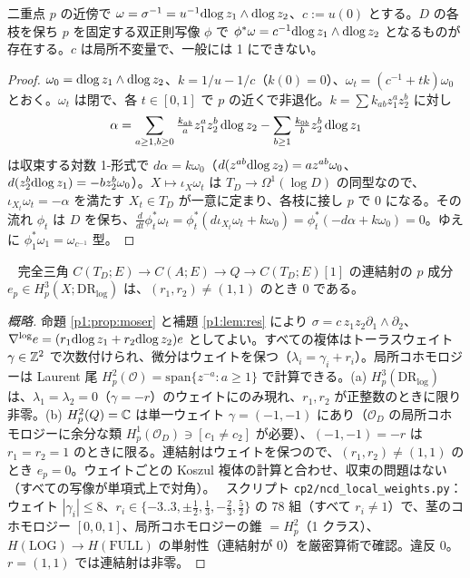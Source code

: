 \begin{prop}\tP\label{p1:prop:moser}
二重点 $p$ の近傍で $\omega=\sigma^{-1}=u^{-1}\mathrm{dlog}\, z_1\wedge\mathrm{dlog}\, z_2$、$c:=u(0)$ とする。$D$ の各枝を保ち $p$ を固定する双正則写像 $\phi$ で $\phi^*\omega=c^{-1}\mathrm{dlog}\, z_1\wedge\mathrm{dlog}\, z_2$ となるものが存在する。$c$ は局所不変量で、一般には 1 にできない。
\end{prop}
\begin{proof}
$\omega_0=\mathrm{dlog}\, z_1\wedge\mathrm{dlog}\, z_2$、$k=1/u-1/c$（$k(0)=0$）、$\omega_t=(c^{-1}+tk)\omega_0$ とおく。$\omega_t$ は閉で、各 $t\in[0,1]$ で $p$ の近くで非退化。$k=\sum k_{ab}z_1^az_2^b$ に対し
\[\alpha=\sum_{a\ge1,b\ge0}\tfrac{k_{ab}}{a}z_1^az_2^b\,\mathrm{dlog}\, z_2-\sum_{b\ge1}\tfrac{k_{0b}}{b}z_2^b\,\mathrm{dlog}\, z_1\]
は収束する対数 1-形式で $d\alpha=k\omega_0$（$d(z^{ab}\mathrm{dlog}\, z_2)=az^{ab}\omega_0$、$d(z_2^b\mathrm{dlog}\, z_1)=-bz_2^b\omega_0$）。$X\mapsto\iota_X\omega_t$ は $T_D\to\Omega^1(\log D)$ の同型なので、$\iota_{X_t}\omega_t=-\alpha$ を満たす $X_t\in T_D$ が一意に定まり、各枝に接し $p$ で 0 になる。その流れ $\phi_t$ は $D$ を保ち、$\tfrac{d}{dt}\phi_t^*\omega_t=\phi_t^*(d\iota_{X_t}\omega_t+k\omega_0)=\phi_t^*(-d\alpha+k\omega_0)=0$。ゆえに $\phi_1^*\omega_1=\omega_{c^{-1}}$ 型。\qedhere
\end{proof}
\begin{lem}[連結射の消滅]\tP\ \tV\label{p1:lem:conn}
完全三角 $C(T_D;E)\to C(A;E)\to Q\to C(T_D;E)[1]$ の連結射の $p$ 成分 $e_p\in H^3_p(X;\mathrm{DR}_{\log})$ は、$(r_1,r_2)\ne(1,1)$ のとき 0 である。
\end{lem}
\begin{proof}[概略]
命題 \ref{p1:prop:moser} と補題 \ref{p1:lem:res} により $\sigma=c\,z_1z_2\partial_1\wedge\partial_2$、$\nabla^{\log}e=(r_1\mathrm{dlog}\, z_1+r_2\mathrm{dlog}\, z_2)e$ としてよい。すべての複体はトーラスウェイト $\gamma\in\mathbb Z^2$ で次数付けられ、微分はウェイトを保つ（$\lambda_i=\gamma_i+r_i$）。局所コホモロジーは Laurent 尾 $H^2_p(\mathcal O)=\mathrm{span}\{z^{-a}:a\ge1\}$ で計算できる。(a) $H^3_p(\mathrm{DR}_{\log})$ は、$\lambda_1=\lambda_2=0$（$\gamma=-r$）のウェイトにのみ現れ、$r_1,r_2$ が正整数のときに限り非零。(b) $H^2_p(Q)=\mathbb C$ は単一ウェイト $\gamma=(-1,-1)$ にあり（$\mathcal O_D$ の局所コホモロジーに余分な類 $H^1_p(\mathcal O_D)\ni[c_1\ne c_2]$ が必要）、$(-1,-1)=-r$ は $r_1=r_2=1$ のときに限る。連結射はウェイトを保つので、$(r_1,r_2)\ne(1,1)$ のとき $e_p=0$。ウェイトごとの Koszul 複体の計算と合わせ、収束の問題はない（すべての写像が単項式上で対角）。
\tV\ スクリプト \texttt{cp2/ncd\_local\_weights.py}：ウェイト $|\gamma_i|\le8$、$r_i\in\{-3..3,\pm\frac12,\frac13,-\frac23,\frac52\}$ の 78 組（すべて $r_i\ne1$）で、茎のコホモロジー $[0,0,1]$、局所コホモロジーの錐 $=H^2_p$（1 クラス）、$H(\mathrm{LOG})\to H(\mathrm{FULL})$ の単射性（連結射が 0）を厳密算術で確認。違反 0。$r=(1,1)$ では連結射は非零。
\end{proof}
